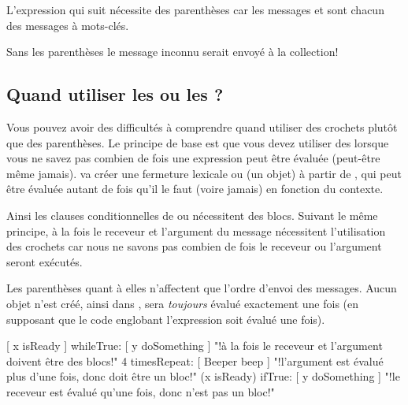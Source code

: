 \documentclass[a4paper,10pt,twoside]{book}
\begin{document}
L'expression qui suit n\'ecessite des parenth\`eses car les messages  et  sont chacun des messages \`a mots-cl\'es. 

\noindent
Sans les parenth\`eses le message inconnu  serait envoy\'e \`a la collection!

\subsection{Quand utiliser les \lct{[ ]} ou les \lct{( )} ?}

Vous pouvez avoir des difficult\'es \`a comprendre quand utiliser des crochets plut\^ot que des parenth\`eses.
Le principe de base est que vous devez utiliser des \ct{[ ]} lorsque vous ne savez pas combien de fois une expression peut \^etre \'evalu\'ee (peut-\^etre m\^eme jamais).
 va cr\'eer une fermeture lexicale ou
 (\ie un objet) \`a partir de
\mbox{,} qui peut \^etre \'evalu\'ee autant de
fois qu'il le faut (voire jamais) en fonction du contexte.

Ainsi les clauses conditionnelles de  ou  n\'ecessitent des blocs. Suivant le m\^eme principe, \`a la fois le receveur et l'argument du message  n\'ecessitent l'utilisation des crochets car nous ne savons pas combien de fois le receveur ou l'argument seront ex\'ecut\'es.

Les parenth\`eses quant \`a elles n'affectent que l'ordre d'envoi des messages.
Aucun objet n'est cr\'e\'e, ainsi dans ,
 sera \emph{toujours} \'evalu\'e exactement une
fois 
(en supposant que le code englobant l'expression soit \'evalu\'e une
fois).

\begin{code}{}
[ x isReady ] whileTrue: [ y doSomething ]   "!\`a la fois le receveur et l'argument doivent \^etre des blocs!"
4 timesRepeat: [ Beeper beep ]                   "!l'argument est \'evalu\'e plus d'une fois, donc doit \^etre un bloc!"
(x isReady) ifTrue: [ y doSomething ]           "!le receveur est \'evalu\'e qu'une fois, donc n'est pas un bloc!"
\end{code}
\end{document}
